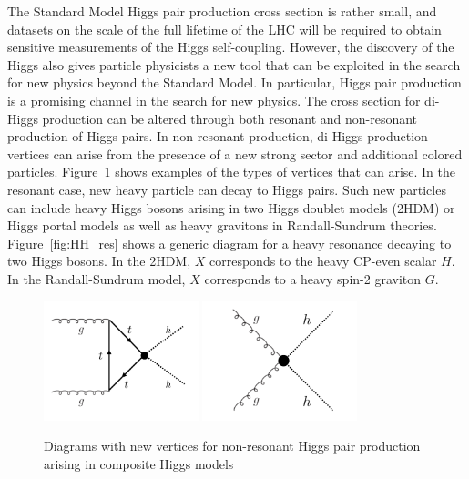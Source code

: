 The Standard Model Higgs pair production cross section is rather small, and datasets on the scale of the full lifetime of the LHC will be required to obtain sensitive measurements of the Higgs self-coupling. However, the discovery of the Higgs also gives particle physicists a new tool that can be exploited in the search for new physics beyond the Standard Model. In particular, Higgs pair production is a promising channel in the search for new physics. The cross section for di-Higgs production can be altered through both resonant and non-resonant production of Higgs pairs. In non-resonant production, di-Higgs production vertices can arise from the presence of a new strong sector and additional colored particles\cite{HH_NewPhys,AnomalousHHVertex,CompositeDiHiggs}. Figure~\ref{fig:HH_nonres} shows examples of the types of vertices that can arise. In the resonant case, new heavy particle can decay to Higgs pairs. Such new particles can include heavy Higgs bosons arising in two Higgs doublet models (2HDM) or Higgs portal models as well as heavy gravitons in Randall-Sundrum theories\cite{HH_NewPhys,RSG1,RSG_LHC,RSG_LHC2,HH_2HDM,2HDM2,2HDM3,HiggsPortal}. Figure~\ref{fig:HH_res} shows a generic diagram for a heavy resonance decaying to two Higgs bosons. In the 2HDM, $X$ corresponds to the heavy CP-even scalar $H$. In the Randall-Sundrum model, $X$ corresponds to a heavy spin-2 graviton $G$. 
%
\begin{figure}[h!]
  \centering
  \captionsetup{justification=centering}

  \includegraphics[width=0.4\textwidth]{figures/HH_nonres1}
  \includegraphics[width=0.4\textwidth]{figures/HH_nonres2}
   \caption{Diagrams with new vertices for non-resonant Higgs pair production arising in composite Higgs models}
  \label{fig:HH_nonres}
\end{figure}
